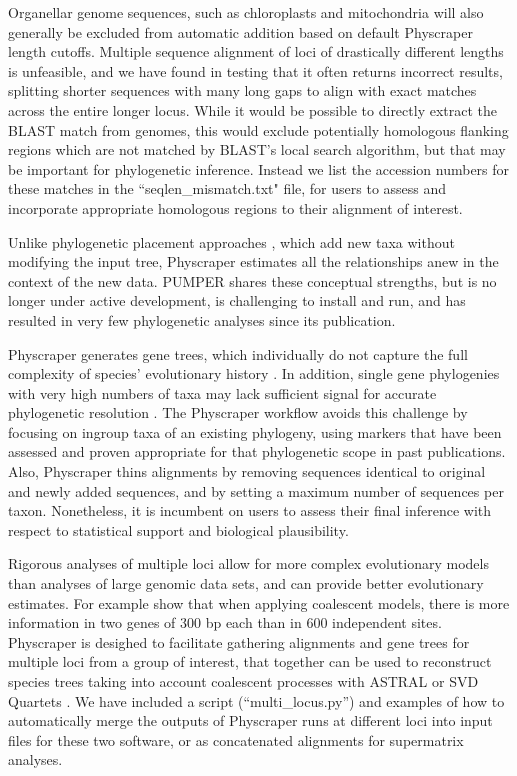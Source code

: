 \documentclass{bmcart}
\begin{document}
Organellar genome sequences, such as chloroplasts and mitochondria will also generally
be excluded from automatic addition based on default Physcraper length cutoffs.
Multiple sequence alignment of loci of drastically different lengths is unfeasible,
and we have found in testing that it often returns incorrect results, splitting
shorter sequences with many long gaps to align with exact matches across the entire
longer locus.
While it would be possible to directly extract the BLAST match from genomes, this
 would exclude potentially homologous flanking regions which are not matched
by BLAST's local search algorithm, but that may be important for phylogenetic inference.
Instead we list the accession numbers for these matches in the ``seqlen\_mismatch.txt"
file, for users to assess and incorporate appropriate homologous regions to their
alignment of interest.

Unlike phylogenetic placement approaches \cite{berger_performance_2011, matsen_pplacer_2010},
which add new taxa without modifying the input tree, Physcraper estimates all
the relationships anew in the context of the new data.
PUMPER \cite{izquierdo2014pumper} shares these conceptual strengths, but is no
longer under active development, is challenging to install and run, and has resulted
in very few phylogenetic analyses since its publication.

Physcraper generates gene trees, which individually do not capture the full complexity
of species' evolutionary history \cite{song2012resolving}. In addition, single gene
phylogenies with very high numbers of taxa may lack sufficient signal
for accurate phylogenetic resolution \cite{morel_phylogenetic_2020}.
The Physcraper workflow avoids this challenge by focusing on ingroup
taxa of an existing phylogeny, using markers that have been assessed and proven
appropriate for that phylogenetic scope in past publications.
Also, Physcraper thins alignments by removing sequences identical to original
and newly added sequences, and by setting a maximum number of sequences per taxon.
Nonetheless, it is incumbent on users to assess their final inference with respect
to statistical support and biological plausibility.

Rigorous analyses of multiple loci allow for more complex evolutionary models
than analyses of large genomic data sets, and can provide better evolutionary estimates.
For example \cite{zhu_complexity_2021} show that when applying coalescent models,
there is more information in two genes of 300 bp each than in 600 independent sites.
Physcraper is desighed to facilitate
gathering alignments and gene trees for multiple loci from a group of interest,
that together can be used to reconstruct species trees taking into account coalescent
processes with ASTRAL \cite{mirarab2014astral} or SVD Quartets \cite{chifman2014quartet}.
We have included a script (``multi\_locus.py'') and examples of how to automatically
merge the outputs of Physcraper runs at different loci into input files for these
two software, or as concatenated alignments for supermatrix analyses.
\end{document}

